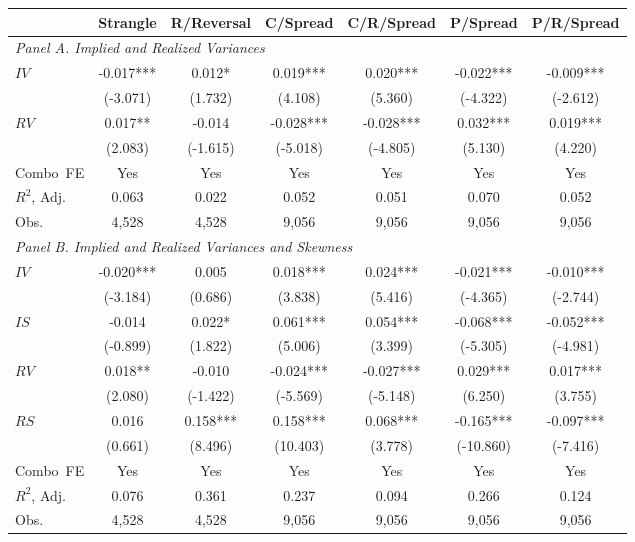 \begin{tabular}{lcccccc}
\toprule
 & Strangle & R/Reversal & C/Spread & C/R/Spread & P/Spread & P/R/Spread \\
\midrule
\multicolumn{5}{l}{\emph{Panel A. Implied and Realized Variances }}    \\
$IV$ & -0.017*** & 0.012* & 0.019*** & 0.020*** & -0.022*** & -0.009*** \\
 & (-3.071) & (1.732) & (4.108) & (5.360) & (-4.322) & (-2.612) \\
$RV$ & 0.017** & -0.014 & -0.028*** & -0.028*** & 0.032*** & 0.019*** \\
 & (2.083) & (-1.615) & (-5.018) & (-4.805) & (5.130) & (4.220) \\
Combo\ FE & Yes & Yes & Yes & Yes & Yes & Yes \\
$R^2$,  Adj. & 0.063 & 0.022 & 0.052 & 0.051 & 0.070 & 0.052 \\
Obs. & 4,528 & 4,528 & 9,056 & 9,056 & 9,056 & 9,056 \\
 \midrule
\multicolumn{5}{l}{\emph{Panel B. Implied and Realized Variances and Skewness}}    \\
$IV$ & -0.020*** & 0.005 & 0.018*** & 0.024*** & -0.021*** & -0.010*** \\
 & (-3.184) & (0.686) & (3.838) & (5.416) & (-4.365) & (-2.744) \\
$IS$ & -0.014 & 0.022* & 0.061*** & 0.054*** & -0.068*** & -0.052*** \\
 & (-0.899) & (1.822) & (5.006) & (3.399) & (-5.305) & (-4.981) \\
$RV$ & 0.018** & -0.010 & -0.024*** & -0.027*** & 0.029*** & 0.017*** \\
 & (2.080) & (-1.422) & (-5.569) & (-5.148) & (6.250) & (3.755) \\
$RS$ & 0.016 & 0.158*** & 0.158*** & 0.068*** & -0.165*** & -0.097*** \\
 & (0.661) & (8.496) & (10.403) & (3.778) & (-10.860) & (-7.416) \\
Combo\ FE & Yes & Yes & Yes & Yes & Yes & Yes \\
$R^2$,  Adj. & 0.076 & 0.361 & 0.237 & 0.094 & 0.266 & 0.124 \\
Obs. & 4,528 & 4,528 & 9,056 & 9,056 & 9,056 & 9,056 \\
\bottomrule
\end{tabular}
